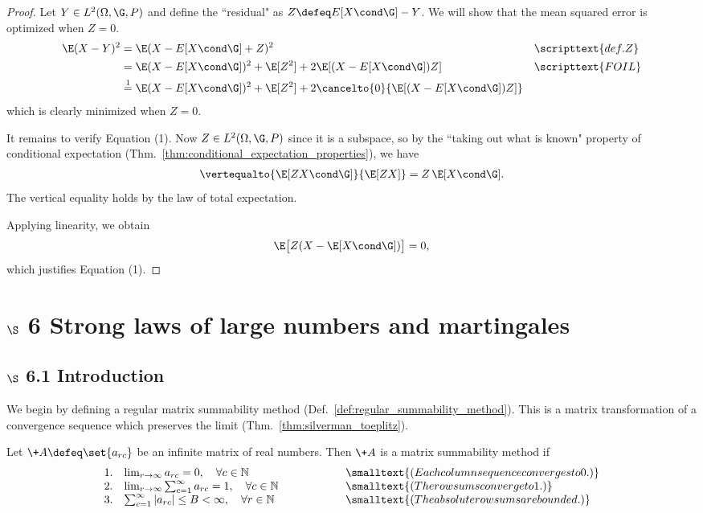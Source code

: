 \documentclass{article} %
\begin{document}
\begin{proof}
Let $Y \in L^2(\Omega, \G, P)$ and define the ``residual" as $Z \defeq E[X \cond \G]-Y$.  We will show that the mean squared error is optimized when $Z=0$.
%
\begin{align*}
\E(X-Y)^2 &= \E(X- E[X \cond \G] + Z)^2 && \scripttext{def. Z} \\
&= \E(X- E[X \cond \G])^2 + \E[Z^2] + 2\E[(X- E[X \cond \G])Z] && \scripttext{FOIL} \\
&\stackrel{1}{=} \E(X- E[X \cond \G])^2 + \E[Z^2] + 2 \cancelto{0}{\E[(X- E[X \cond \G])Z]}
\end{align*}
which is clearly minimized when $Z = 0$.

It remains to verify Equation (1).  Now $Z \in L^2(\Omega, \G, P)$ since it is a subspace, so by the ``taking out what is known" property of conditional expectation (Thm.~\ref{thm:conditional_expectation_properties}), we have
\begin{align*}
\vertequalto{\E[ZX \cond \G]}{\E[ZX]} = Z \, \E[X \cond \G].
\end{align*} 
%
The vertical equality holds by the law of total expectation.

Applying linearity, we obtain
\[ \E\big[Z(X - \E[X \cond \G])\big] = 0, \]
which justifies Equation (1).
\end{proof}

\section{$\S$ 6 Strong laws of large numbers and martingales}

\subsection{$\S$ 6.1 Introduction}

We begin by defining a regular matrix summability method (Def.~\ref{def:regular_summability_method}). This is a matrix transformation of a convergence sequence which preserves the limit (Thm.~\ref{thm:silverman_toeplitz}). 

\begin{definition}
Let $\+A \defeq \set{a_{rc}}$ be an infinite matrix of real numbers.  Then $\+A$ is a matrix summability method if 
\[\begin{array}{rlcl}
1. & \lim_{r \to \infty} a_{rc}=0, \quad \forall c \in \mathbb{N}&
\qquad \qquad & \smalltext{(Each column sequence converges to 0.)} \\
2. & \lim_{r \to \infty} \sum_{c=1}^\infty a_{rc}=1, \quad \forall c \in \mathbb{N}&
\qquad \qquad & \smalltext{(The row sums converge to 1.)} \\
3. & \sum_{c=1}^\infty |a_{rc}| \leq B < \infty, \quad \forall r \in \mathbb{N}&
\qquad \qquad & \smalltext{(The absolute row sums are bounded.)}
\end{array} \] 
\label{def:regular_summability_method}
\end{definition}
\end{document}

